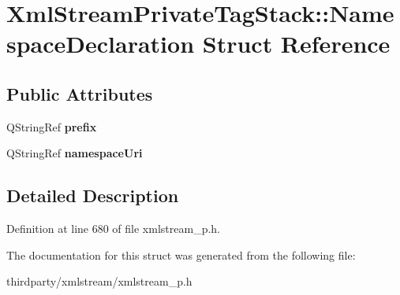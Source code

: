 \hypertarget{struct_xml_stream_private_tag_stack_1_1_namespace_declaration}{}\section{Xml\+Stream\+Private\+Tag\+Stack\+:\+:Namespace\+Declaration Struct Reference}
\label{struct_xml_stream_private_tag_stack_1_1_namespace_declaration}
\subsection*{Public Attributes}
\begin{DoxyCompactItemize}
\item 
\mbox{\label{struct_xml_stream_private_tag_stack_1_1_namespace_declaration_adcf7a1a1acd667fb9c5fa06b4ba6fa4f}} 
Q\+String\+Ref {\bfseries prefix}
\item 
\mbox{\label{struct_xml_stream_private_tag_stack_1_1_namespace_declaration_ad3bfbaea8ae6d2b07aecbce39794b97b}} 
Q\+String\+Ref {\bfseries namespace\+Uri}
\end{DoxyCompactItemize}


\subsection{Detailed Description}


Definition at line 680 of file xmlstream\+\_\+p.\+h.



The documentation for this struct was generated from the following file\+:\begin{DoxyCompactItemize}
\item 
thirdparty/xmlstream/xmlstream\+\_\+p.\+h\end{DoxyCompactItemize}
